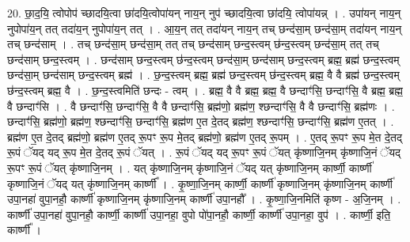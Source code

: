\documentclass[17pt]{extarticle}
\begin{document}
20. छा॒द॒यि॒ त्वोपोप॑ च्छादयि॒त्वा छा॑दयि॒त्वोपा॑यन् नाय॒न् नुप॑ च्छादयि॒त्वा छा॑दयि॒ त्वोपा॑यन्न् । . उपा॑यन् नाय॒न् नुपोपा॑य॒न् तत् तदा॑य॒न् नुपोपा॑य॒न् तत् । . आ॒य॒न् तत् तदा॑यन् नाय॒न् तच् छन्द॑सा॒म् छन्द॑सा॒म् तदा॑यन् नाय॒न् तच् छन्द॑साम् । . तच् छन्द॑सा॒म् छन्द॑सा॒म् तत् तच् छन्द॑साम् छन्द॒स्त्वम् छ॑न्द॒स्त्वम् छन्द॑सा॒म् तत् तच् छन्द॑साम् छन्द॒स्त्वम् । . छन्द॑साम् छन्द॒स्त्वम् छ॑न्द॒स्त्वम् छन्द॑सा॒म् छन्द॑साम् छन्द॒स्त्वम् ब्रह्म॒ ब्रह्म॑ छन्द॒स्त्वम् छन्द॑सा॒म् छन्द॑साम् छन्द॒स्त्वम् ब्रह्म॑ । . छ॒न्द॒स्त्वम् ब्रह्म॒ ब्रह्म॑ छन्द॒स्त्वम् छ॑न्द॒स्त्वम् ब्रह्म॒ वै वै ब्रह्म॑ छन्द॒स्त्वम् छ॑न्द॒स्त्वम् ब्रह्म॒ वै । . छ॒न्द॒स्त्वमिति॑ छन्दः - त्वम् । . ब्रह्म॒ वै वै ब्रह्म॒ ब्रह्म॒ वै छन्दाꣳ॑सि॒ छन्दाꣳ॑सि॒ वै ब्रह्म॒ ब्रह्म॒ वै छन्दाꣳ॑सि । . वै छन्दाꣳ॑सि॒ छन्दाꣳ॑सि॒ वै वै छन्दाꣳ॑सि॒ ब्रह्म॑णो॒ ब्रह्म॑ण॒ श्छन्दाꣳ॑सि॒ वै वै छन्दाꣳ॑सि॒ ब्रह्म॑णः । . छन्दाꣳ॑सि॒ ब्रह्म॑णो॒ ब्रह्म॑ण॒ श्छन्दाꣳ॑सि॒ छन्दाꣳ॑सि॒ ब्रह्म॑ण ए॒त दे॒तद् ब्रह्म॑ण॒ श्छन्दाꣳ॑सि॒ छन्दाꣳ॑सि॒ ब्रह्म॑ण ए॒तत् । . ब्रह्म॑ण ए॒त दे॒तद् ब्रह्म॑णो॒ ब्रह्म॑ण ए॒तद् रू॒पꣳ रू॒प मे॒तद् ब्रह्म॑णो॒ ब्रह्म॑ण ए॒तद् रू॒पम् । . ए॒तद् रू॒पꣳ रू॒प मे॒त दे॒तद् रू॒पं ॅयद् यद् रू॒प मे॒त दे॒तद् रू॒पं ॅयत् । . रू॒पं ॅयद् यद् रू॒पꣳ रू॒पं ॅयत् कृ॑ष्णाजि॒नम् कृ॑ष्णाजि॒नं ॅयद् रू॒पꣳ रू॒पं ॅयत् कृ॑ष्णाजि॒नम् । . यत् कृ॑ष्णाजि॒नम् कृ॑ष्णाजि॒नं ॅयद् यत् कृ॑ष्णाजि॒नम् कार्ष्णी॒ कार्ष्णी॑ कृष्णाजि॒नं ॅयद् यत् कृ॑ष्णाजि॒नम् कार्ष्णी᳚ । . कृ॒ष्णा॒जि॒नम् कार्ष्णी॒ कार्ष्णी॑ कृष्णाजि॒नम् कृ॑ष्णाजि॒नम् कार्ष्णी॑ उपा॒नहा॑ वुपा॒नहौ॒ कार्ष्णी॑ कृष्णाजि॒नम् कृ॑ष्णाजि॒नम् कार्ष्णी॑ उपा॒नहौ᳚ । . कृ॒ष्णा॒जि॒नमिति॑ कृष्ण - अ॒जि॒नम् । . कार्ष्णी॑ उपा॒नहा॑ वुपा॒नहौ॒ कार्ष्णी॒ कार्ष्णी॑ उपा॒नहा॒ वुपो पो॑पा॒नहौ॒ कार्ष्णी॒ कार्ष्णी॑ उपा॒नहा॒ वुप॑ । . कार्ष्णी॒ इति॒ कार्ष्णी᳚ । \newline
\end{document}
